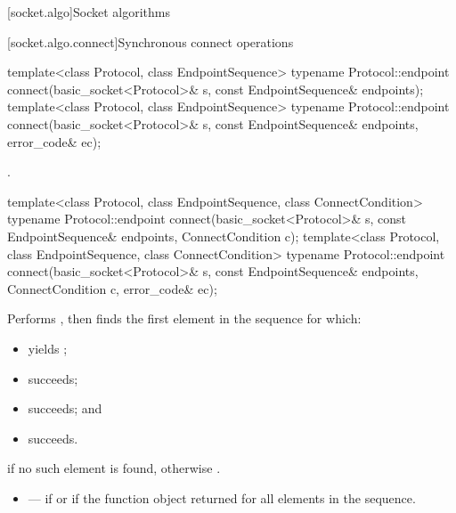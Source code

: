 
[socket.algo]{Socket algorithms}


[socket.algo.connect]{Synchronous connect operations}

\begin{itemdecl}
template<class Protocol, class EndpointSequence>
  typename Protocol::endpoint connect(basic_socket<Protocol>& s,
                                      const EndpointSequence& endpoints);
template<class Protocol, class EndpointSequence>
  typename Protocol::endpoint connect(basic_socket<Protocol>& s,
                                      const EndpointSequence& endpoints,
                                      error_code& ec);
\end{itemdecl}

\begin{itemdescr}
\pnum
\returns {}.
\end{itemdescr}

\begin{itemdecl}
template<class Protocol, class EndpointSequence, class ConnectCondition>
  typename Protocol::endpoint connect(basic_socket<Protocol>& s,
                                      const EndpointSequence& endpoints,
                                      ConnectCondition c);
template<class Protocol, class EndpointSequence, class ConnectCondition>
  typename Protocol::endpoint connect(basic_socket<Protocol>& s,
                                      const EndpointSequence& endpoints,
                                      ConnectCondition c, error_code& ec);
\end{itemdecl}

\begin{itemdescr}
\pnum
\effects Performs , then finds the first element  in the sequence  for which:
\begin{itemize}
\item
{} yields ;
\item
{} succeeds;
\item
{} succeeds; and
\item
{} succeeds.
\end{itemize}

\pnum
\returns {} if no such element is found, otherwise .

\pnum
\errors
\begin{itemize}
\item
{} --- if  or if the function object  returned  for all elements in the sequence.
\end{itemize}
\end{itemdescr}

